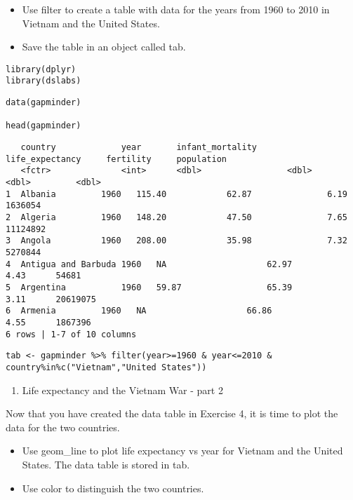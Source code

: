 \documentclass[]{article}
\providecommand{\tightlist}{%
  \setlength{\itemsep}{0pt}\setlength{\parskip}{0pt}}
\begin{document}
\begin{itemize}
\tightlist
\item
  Use filter to create a table with data for the years from 1960 to 2010
  in Vietnam and the United States.
\item
  Save the table in an object called tab.
\end{itemize}

\begin{verbatim}
library(dplyr)
library(dslabs)
\end{verbatim}

\begin{verbatim}
data(gapminder)

head(gapminder)
\end{verbatim}

\begin{verbatim}
   country             year       infant_mortality      life_expectancy     fertility     population
   <fctr>              <int>      <dbl>                 <dbl>               <dbl>         <dbl>
1  Albania         1960   115.40            62.87               6.19      1636054   
2  Algeria         1960   148.20            47.50               7.65      11124892  
3  Angola          1960   208.00            35.98               7.32      5270844   
4  Antigua and Barbuda 1960   NA                    62.97               4.43      54681 
5  Argentina           1960   59.87                 65.39               3.11      20619075  
6  Armenia         1960   NA                    66.86               4.55      1867396   
6 rows | 1-7 of 10 columns
\end{verbatim}

\begin{verbatim}
tab <- gapminder %>% filter(year>=1960 & year<=2010 & country%in%c("Vietnam","United States"))
\end{verbatim}

\begin{enumerate}
\def\labelenumi{\arabic{enumi}.}
\setcounter{enumi}{4}
\tightlist
\item
  Life expectancy and the Vietnam War - part 2
\end{enumerate}

Now that you have created the data table in Exercise 4, it is time to
plot the data for the two countries.

\begin{itemize}
\tightlist
\item
  Use geom\_line to plot life expectancy vs year for Vietnam and the
  United States. The data table is stored in tab.
\item
  Use color to distinguish the two countries.
\end{itemize}
\end{document}
